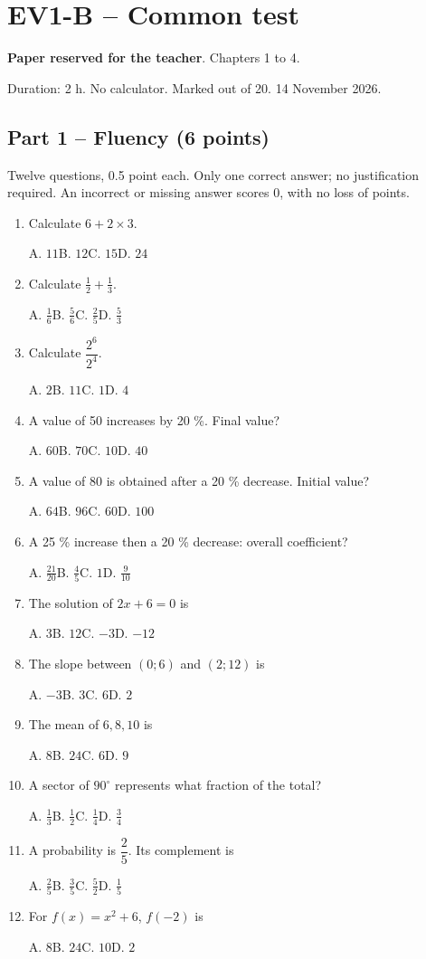 \mxnewpage\section*{EV1-B -- Common test}\label{EV1-B}
\textbf{Paper reserved for the teacher}. Chapters 1 to 4.\par Duration: 2 h. No calculator. Marked out of 20. 14 November 2026.
\subsection*{Part 1 -- Fluency (6 points)}
Twelve questions, 0.5 point each. Only one correct answer; no justification required. An incorrect or missing answer scores 0, with no loss of points.
\begin{enumerate}
\item Calculate $6+2\times3$.\par A. $11$\quad B. $12$\quad C. $15$\quad D. $24$
\item Calculate $\frac12+\frac13$.\par A. $\frac{1}{6}$\quad B. $\frac{5}{6}$\quad C. $\frac{2}{5}$\quad D. $\frac{5}{3}$
\item Calculate $\dfrac{2^6}{2^{4}}$.\par A. $2$\quad B. $11$\quad C. $1$\quad D. $4$
\item A value of 50 increases by 20 \%. Final value?\par A. $60$\quad B. $70$\quad C. $10$\quad D. $40$
\item A value of 80 is obtained after a 20 \% decrease. Initial value?\par A. $64$\quad B. $96$\quad C. $60$\quad D. $100$
\item A 25 \% increase then a 20 \% decrease: overall coefficient?\par A. $\frac{21}{20}$\quad B. $\frac{4}{5}$\quad C. $1$\quad D. $\frac{9}{10}$
\item The solution of $2x+6=0$ is\par A. $3$\quad B. $12$\quad C. $-3$\quad D. $-12$
\item The slope between $(0;6)$ and $(2;12)$ is\par A. $-3$\quad B. $3$\quad C. $6$\quad D. $2$
\item The mean of $6, 8, 10$ is\par A. $8$\quad B. $24$\quad C. $6$\quad D. $9$
\item A sector of $90^\circ$ represents what fraction of the total?\par A. $\frac{1}{3}$\quad B. $\frac{1}{2}$\quad C. $\frac{1}{4}$\quad D. $\frac{3}{4}$
\item A probability is $\dfrac{2}{5}$. Its complement is\par A. $\frac{2}{5}$\quad B. $\frac{3}{5}$\quad C. $\frac{5}{2}$\quad D. $\frac{1}{5}$
\item For $f(x)=x^2+6$, $f(-2)$ is\par A. $8$\quad B. $24$\quad C. $10$\quad D. $2$
\end{enumerate}
